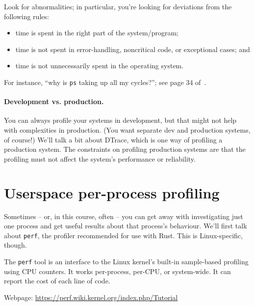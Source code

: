 Look for abnormalities; in particular, you're looking for
deviations from the following rules:
\begin{itemize}[noitemsep]
\item time is spent in the right part of the system/program;
\item time is not spent in error-handling, noncritical code, or exceptional cases; and
\item time is not unnecessarily spent in the operating system.
\end{itemize}
For instance, ``why is {\tt ps} taking up all my cycles?'';
see page 34 of~\cite{300ps}.

\paragraph{Development vs. production.}
You can always profile your systems in development, but that might not
help with complexities in production. (You want separate dev and
production systems, of course!) We'll talk a bit about DTrace, which
is one way of profiling a production system. The constraints on profiling 
production systems are that the profiling must not affect the system's
performance or reliability.

\section*{Userspace per-process profiling}
Sometimes -- or, in this course, often -- you can get away with
investigating just one process and get useful results about that
process's behaviour. We'll first talk about {\tt perf}, the profiler 
recommended for use with Rust. This is Linux-specific, though.

The \texttt{perf} tool is an interface to the Linux kernel's built-in
sample-based profiling using CPU counters. It works per-process, per-CPU, or system-wide. It can report the cost of each line of code.

Webpage: \url{https://perf.wiki.kernel.org/index.php/Tutorial}

